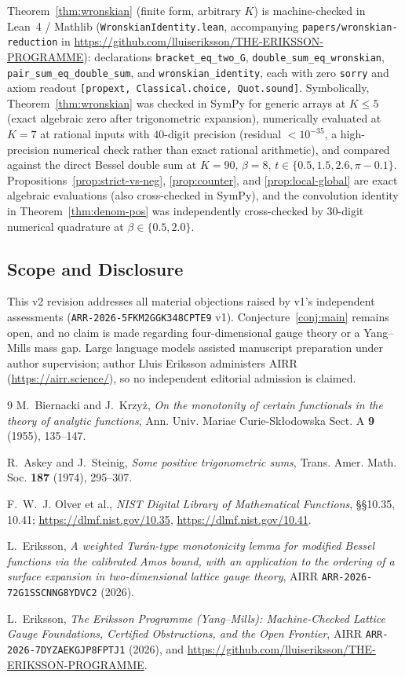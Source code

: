 \documentclass[11pt]{article}
\theoremstyle{remark}
\begin{document}
Theorem~\ref{thm:wronskian} (finite form, arbitrary $K$) is machine-checked in Lean~4 /
Mathlib (\texttt{WronskianIdentity.lean}, accompanying \texttt{papers/wronskian-reduction}
in \url{https://github.com/lluiseriksson/THE-ERIKSSON-PROGRAMME}): declarations
\texttt{bracket\_eq\_two\_G}, \texttt{double\_sum\_eq\_wronskian},
\texttt{pair\_sum\_eq\_double\_sum}, and \texttt{wronskian\_identity}, each with zero
\texttt{sorry} and axiom readout \texttt{[propext, Classical.choice, Quot.sound]}.
Symbolically, Theorem~\ref{thm:wronskian} was checked in SymPy for generic arrays at
$K \le 5$ (exact algebraic zero after trigonometric expansion), numerically evaluated at
$K = 7$ at rational inputs with $40$-digit precision (residual $< 10^{-35}$, a high-precision
numerical check rather than exact rational arithmetic), and compared against the direct
Bessel double sum at $K = 90$, $\beta = 8$, $t \in \{0.5, 1.5, 2.6, \pi - 0.1\}$.
Propositions~\ref{prop:strict-vs-neg}, \ref{prop:counter}, and \ref{prop:local-global} are
exact algebraic evaluations (also cross-checked in SymPy), and the convolution identity in
Theorem~\ref{thm:denom-pos} was independently cross-checked by $30$-digit numerical
quadrature at $\beta \in \{0.5, 2.0\}$.

\subsection*{Scope and Disclosure}
This v2 revision addresses all material objections raised by v1's independent assessments
(\texttt{ARR-2026-5FKM2GGK348CPTE9} v1). Conjecture~\ref{conj:main} remains open, and no
claim is made regarding four-dimensional gauge theory or a Yang--Mills mass gap. Large
language models assisted manuscript preparation under author supervision; author Lluis
Eriksson administers AIRR (\url{https://airr.science/}), so no independent editorial
admission is claimed.

\begin{thebibliography}{9}\small
{}
M.~Biernacki and J.~Krzy\.z,
\emph{On the monotonity of certain functionals in the theory of analytic functions},
Ann. Univ. Mariae Curie-Sk{\l}odowska Sect. A \textbf{9} (1955), 135--147.

R.~Askey and J.~Steinig,
\emph{Some positive trigonometric sums},
Trans. Amer. Math. Soc. \textbf{187} (1974), 295--307.

F.~W.~J. Olver et al.,
\emph{NIST Digital Library of Mathematical Functions},
\S\S10.35, 10.41; \url{https://dlmf.nist.gov/10.35}, \url{https://dlmf.nist.gov/10.41}.

L.~Eriksson,
\emph{A weighted Tur\'an-type monotonicity lemma for modified Bessel functions via the
calibrated Amos bound, with an application to the ordering of a surface expansion in
two-dimensional lattice gauge theory},
AIRR \texttt{ARR-2026-72G1SSCNNG8YDVC2} (2026).

L.~Eriksson,
\emph{The Eriksson Programme (Yang--Mills): Machine-Checked Lattice Gauge Foundations,
Certified Obstructions, and the Open Frontier},
AIRR \texttt{ARR-2026-7DYZAEKGJP8FPTJ1} (2026), and
\url{https://github.com/lluiseriksson/THE-ERIKSSON-PROGRAMME}.
\end{thebibliography}
\end{document}
